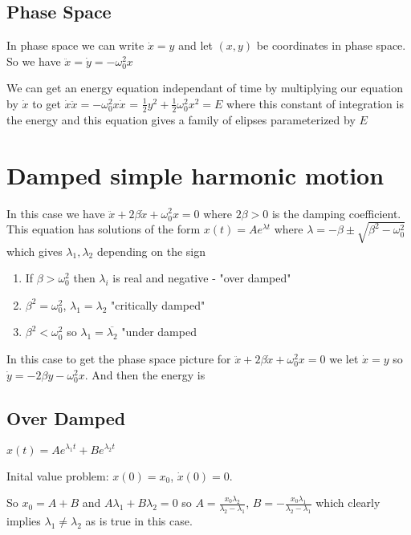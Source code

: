 \documentclass{homework}
\begin{document}
\subsection{Phase Space}
In phase space we can write $\dot x = y$ and let $(x,y)$ be coordinates in phase space. So we have $\ddot x = \dot y =  -\omega_0^2 x$

We can get an energy equation independant of time by multiplying our equation by $\dot x$ to get $\dot x \ddot x = -\omega_0^2 x \dot x$ = $\frac{1}{2}y^2 + \frac{1}{2}\omega_0^2x^2 = E$ where this constant of integration is the energy and this equation gives a family of elipses parameterized by $E$




\section{Damped simple harmonic motion}
In this case we have $\ddot x + 2\beta \dot x + \omega_0^2 x = 0$ where $2\beta >0$ is the damping coefficient. This equation has solutions of the form $x(t) = Ae^{\lambda t}$ where $\lambda = -\beta \pm \sqrt{\beta^2 - \omega_0^2}$ which gives $\lambda_1, \lambda_2$ depending on the sign

\begin{enumerate}
    \item  If $\beta > \omega_0^2$ then $\lambda_i$ is real and negative - "over damped"
    \item $\beta^2 = \omega_0^2$, $\lambda_1 = \lambda_2$ "critically damped"
    \item $\beta^2 < \omega_0^2$ so $\lambda_1 = \overline{\lambda_2}$ "under damped
\end{enumerate}


In this case to get the phase space picture for $\ddot x + 2\beta \dot x + \omega_0^2 x = 0$ we let $\dot x = y$ so $\dot y = -2\beta y - \omega_0^2x$. And then the energy is 

\subsection{Over Damped}

$x(t) = Ae^{\lambda_1 t} + Be^{\lambda_2 t}$

Inital value problem: $x(0) = x_0$, $\dot x(0) = 0$.

So $x_0 = A + B$ and $A \lambda_1 + B \lambda_2 = 0$ so $A = \frac{x_0 \lambda_2}{\lambda_2 - \lambda_1}$, $B = -\frac{x_0 \lambda_1}{\lambda_2 - \lambda_1}$ which clearly implies $\lambda_1 \neq \lambda_2$ as is true in this case.
\end{document}
